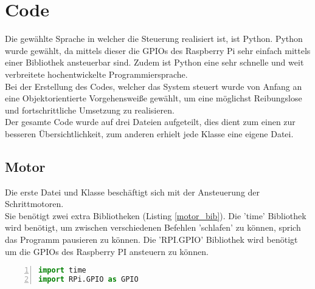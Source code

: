 
\chapter{Code}
Die gewählte Sprache in welcher die Steuerung realisiert ist, ist Python. Python wurde gewählt, da mittels dieser die \acp{GPIO} des Raspberry Pi sehr einfach mittels einer Bibliothek ansteuerbar sind. Zudem ist Python eine sehr schnelle und weit verbreitete hochentwickelte Programmiersprache.\\
Bei der Erstellung des Codes, welcher das System steuert wurde von Anfang an eine Objektorientierte Vorgehensweiße gewählt, um eine möglichst Reibungslose und fortschrittliche Umsetzung zu realisieren.\\
Der gesamte Code wurde auf drei Dateien aufgeteilt, dies dient zum einen zur besseren Übersichtlichkeit, zum anderen erhielt jede Klasse eine eigene Datei.
\section{Motor}
Die erste Datei und Klasse beschäftigt sich mit der Ansteuerung der Schrittmotoren.\\
Sie benötigt zwei extra Bibliotheken (Listing \ref{motor_bib}). Die 'time' Bibliothek wird benötigt, um zwischen verschiedenen Befehlen 'schlafen' zu können, sprich das Programm pausieren zu können. Die 'RPI.GPIO' Bibliothek wird benötigt um die \acp{GPIO} des Raspberry PI ansteuern zu können. 
\begin{lstlisting}[caption={Bibliotheken der Motor Klasse}, language={Python}, label={motor_bib}, numbers=left]
import time
import RPi.GPIO as GPIO	
\end{lstlisting}

